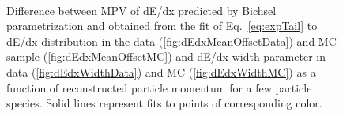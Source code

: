 \begin{figure}[hb]
{}
\quad
\parbox{0.4725\textwidth}{
  \centering
  \begin{subfigure}[b]{\linewidth}
  \end{subfigure}\\
  \begin{subfigure}[b]{\linewidth}
  \end{subfigure}
}%
\caption[Parameters of track dE/dx as a function of reconstructed momentum for a few particle species.]{Difference between MPV of dE/dx predicted by Bichsel parametrization and obtained from the fit of Eq.~\eqref{eq:expTail} to dE/dx distribution in the data (\ref{fig:dEdxMeanOffsetData}) and MC sample (\ref{fig:dEdxMeanOffsetMC}) and dE/dx width parameter in data (\ref{fig:dEdxWidthData}) and MC (\ref{fig:dEdxWidthMC}) as a function of reconstructed particle momentum for a few particle species. Solid lines represent fits to points of corresponding color.}\label{fig:dEdxParametersMC}
\end{figure}


